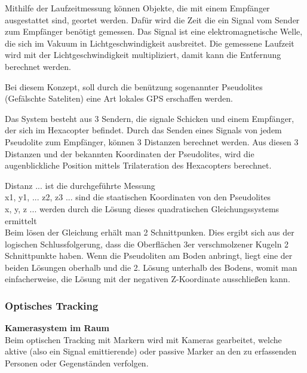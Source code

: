       Mithilfe der Laufzeitmessung können Objekte, die mit einem Empfänger ausgestattet sind, geortet werden. Dafür wird die Zeit die ein Signal vom Sender zum Empfänger benötigt gemessen. Das Signal ist eine elektromagnetische Welle, die sich im Vakuum in Lichtgeschwindigkeit ausbreitet. Die gemessene Laufzeit wird mit der Lichtgeschwindigkeit multipliziert, damit kann die Entfernung berechnet werden. 

      Bei diesem Konzept, soll durch die benützung sogenannter Pseudolites (Gefälschte Sateliten) eine Art lokales GPS erschaffen werden.

      Das System besteht aus 3 Sendern, die signale Schicken und einem Empfänger, der sich im Hexacopter befindet.
      Durch das Senden eines Signals von jedem Pseudolite zum Empfänger, können 3 Distanzen berechnet werden.
      Aus diesen 3 Distanzen und der bekannten Koordinaten der Pseudolites, wird die augenblickliche Position mittels Trilateration des Hexacopters berechnet.


      Distanz ... ist die durchgeführte Messung\\
      x1, y1, ... z2, z3 ... sind die staatischen Koordinaten von den Pseudolites \\
      x, y, z ... werden durch die Lösung dieses quadratischen Gleichungssystems ermittelt \\
      
      Beim lösen der Gleichung erhält man 2 Schnittpunken. Dies ergibt sich aus der logischen Schlussfolgerung, dass die Oberflächen 3er verschmolzener Kugeln 2 Schnittpunkte haben.
      Wenn die Pseudoliten am Boden anbringt, liegt eine der beiden Lösungen oberhalb und die 2. Lösung unterhalb des Bodens, womit man einfacherweise, die Lösung mit der negativen Z-Koordinate ausschließen kann.

    \subsubsection{Optisches Tracking}

  \textbf{Kamerasystem im Raum}\\

  Beim optischen Tracking mit Markern wird mit Kameras gearbeitet, welche aktive (also ein Signal emittierende) oder passive Marker an den zu erfassenden Personen oder Gegenständen verfolgen. 


